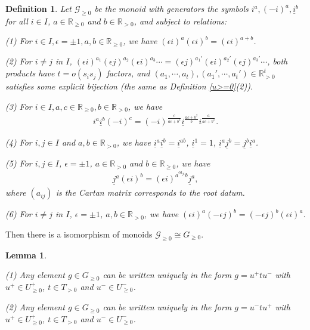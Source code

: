 \documentclass[12pt]{amsart}
\newtheorem{lemma}[theorem]{Lemma}
\newtheorem{definition}[theorem]{Definition}
\begin{document}
\begin{definition}\label{G>=0}
    \cite[2.10]{TR2}
    Let $\mathcal{G}_{\geq 0}$ be the monoid with generators the symbols $i^a,(-i)^a,\underline{i}^b$ for all $i\in I$, $a\in \mathbb{R}_{\geq 0}$ and $b\in \mathbb{R}_{>0}$, and subject to relations:

    (1) For $i\in I, \epsilon =\pm 1, a,b\in \mathbb{R}_{\geq 0}$, we have $(\epsilon i)^a (\epsilon i)^b = (\epsilon i)^{a+b}$.

    (2) For $i\neq j$ in $I$, $(\epsilon i)^{a_1}(\epsilon j)^{a_2}(\epsilon i)^{a_3}\cdots = (\epsilon j)^{a_1'}(\epsilon i)^{a_2'}(\epsilon j)^{a_3'}\cdots$, both products have $t=o(s_is_j)$ factors, and $(a_1,\cdots,a_t),(a_1',\cdots,a_t')\in \mathbb{R}_{>0}^t$ satisfies some explicit bijection (the same as Definition \ref{u>=0}(2)).

    (3) For $i\in I, a,c\in \mathbb{R}_{\geq 0}, b\in \mathbb{R}_{>0}$, we have 
    \begin{align*}
        i^a \underline{i}^b (-i)^c = (-i)^{\frac{c}{ac+b^2}} \underline{i}^{\frac{ac+b^2}{b}} i^{\frac{a}{ac+b^2}}.
    \end{align*}

    (4) For $i,j\in I$ and $a,b\in \mathbb{R}_{>0}$, we have $\underline{i}^a \underline{i}^b = \underline{i}^{ab}$, $\underline{i}^1=1$, $\underline{i}^a \underline{j}^b = \underline{j}^b \underline{i}^a$.

    (5) For $i,j\in I$, $\epsilon =\pm 1$, $a\in \mathbb{R}_{>0}$ and $b\in \mathbb{R}_{\geq 0}$, we have 
    \begin{align*}
        \underline{j}^a (\epsilon i)^b = (\epsilon i)^{a^{\epsilon a_{ji}}b}\underline{j}^a,
    \end{align*}
    where $(a_{ij})$ is the Cartan matrix corresponds to the root datum.

    (6) For $i\neq j$ in $ I$, $\epsilon =\pm 1$, $a,b\in \mathbb{R}_{>0}$, we have $(\epsilon i)^a (-\epsilon j)^b = (-\epsilon j)^b (\epsilon i)^a$.
\end{definition}

Then there is a isomorphism of monoids $\mathcal{G}_{\geq 0}\cong G_{\geq 0}$.

\begin{lemma}\label{utu}
    \cite[Lemma 2.3]{TR1}

    (1) Any element $g\in G_{\geq 0}$ can be written uniquely in the form $g=u^+ t u^-$ with $u^+\in U^+_{\geq 0}$, $t\in T_{>0}$ and $u^-\in U^-_{\geq 0}$.

    (2) Any element $g\in G_{\geq 0}$ can be written uniquely in the form $g=u^- t u^+$ with $u^+\in U^+_{\geq 0}$, $t\in T_{>0}$ and $u^-\in U^-_{\geq 0}$.
\end{lemma}
\end{document}
